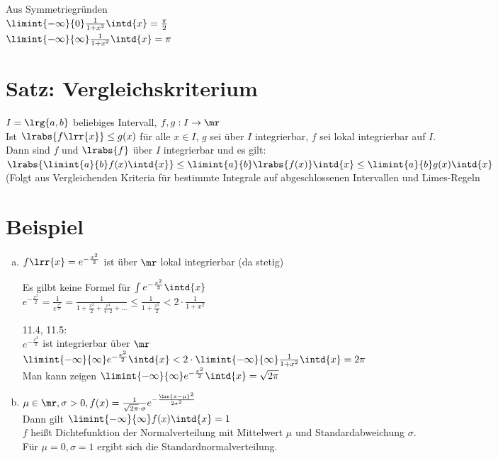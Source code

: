 	Aus Symmetriegründen\\
	$\limint{-\infty}{0}\frac{1}{1+x^2}\intd{x}=\frac{\pi}{2}$\\
	$\limint{-\infty}{\infty}\frac{1}{1+x^2}\intd{x}=\pi$
	
\section{Satz: Vergleichskriterium}
	$I=\lrg{a,b}$ beliebiges Intervall, $f,g: I\rightarrow\mr$\\
	Ist $\lrabs{f\lrr{x}}\leq g(x)$ für alle $x\in I$, $g$ sei über $I$ integrierbar, $f$ sei lokal integrierbar auf $I$.\\
	Dann sind $f$ und $\lrabs{f}$ über $I$ integrierbar und es gilt:\\
	$\lrabs{\limint{a}{b}f(x)\intd{x}}\leq\limint{a}{b}\lrabs{f(x)}\intd{x}\leq\limint{a}{b}g(x)\intd{x}$\\
	(Folgt aus Vergleichenden Kriteria für bestimmte Integrale auf abgeschlossenen Intervallen und Limes-Regeln
	
\section{Beispiel}
	\begin{enumerate}[a)]
		\item $f\lrr{x}=e^{-\frac{x^2}{2}}$ ist über $\mr$ lokal integrierbar (da stetig)\\
			
			Es gilbt keine Formel für $\int e^{-\frac{x^2}{2}}\intd{x}$\\
			$e^{-\frac{x^2}{2}}=\frac{1}{e^{\frac{x^2}{2}}}=\frac{1}{1+\frac{x^2}{2}+\frac{x^4}{4\cdot 2}+\dots}\leq\frac{1}{1+\frac{x^2}{2}}< 2\cdot\frac{1}{1+x^2}$
			
			11.4, 11.5:\\
			$e^{-\frac{x^2}{2}}$ ist integrierbar über $\mr$\\
			$\limint{-\infty}{\infty}e^{-\frac{x^2}{2}}\intd{x}<2\cdot\limint{-\infty}{\infty}\frac{1}{1+x^2}\intd{x}=2\pi$\\
			Man kann zeigen $\limint{-\infty}{\infty}e^{-\frac{x^2}{2}}\intd{x}=\sqrt{2\pi}$
		\item $\mu\in\mr, \sigma>0, f(x)=\frac{1}{\sqrt{2\pi}\cdot\sigma}e^{-\frac{\lrr{x-\mu}^2}{2\sigma^2}}$\\
			Dann gilt $\limint{-\infty}{\infty}f(x)\intd{x}=1$\\
			$f$ heißt Dichtefunktion der Normalverteilung mit Mittelwert $\mu$ und Standardabweichung $\sigma$.\\
			Für $\mu=0, \sigma=1$ ergibt sich die Standardnormalverteilung.
	\end{enumerate}
